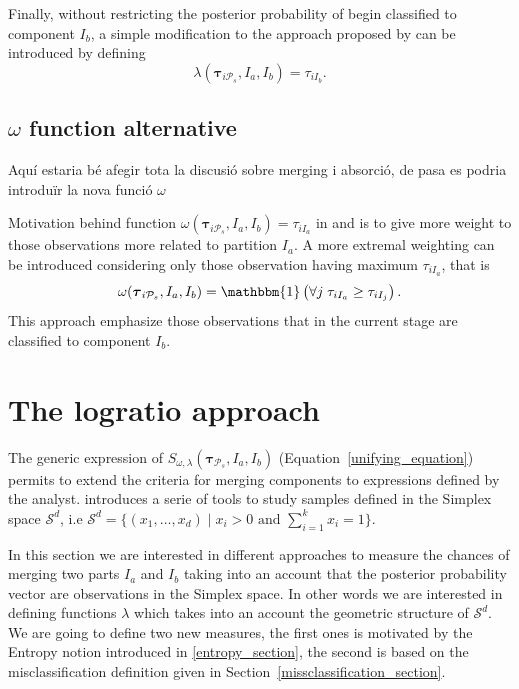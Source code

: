 \documentclass[10pt, a4paper]{article}
\newcommand{\m}[1]{\boldsymbol{#1}}
\begin{document}
\begin{spacing}{1.9}
Finally, without restricting  the posterior probability of begin classified to component $I_b$, a simple modification to the approach proposed by \cite{longford2014} can be introduced by defining
\[
\lambda(\m\tau_{i \mathcal{P}_s},  I_a,  I_b) = \tau_{iI_b}.
\]

\subsection{$\omega$ function alternative}
{ \color{red} Aquí estaria bé afegir tota la discusió sobre merging i absorció, de pasa es podria introduïr la nova funció $\omega$}

Motivation behind function $\omega(\m\tau_{i \mathcal{P}_s},  I_a,  I_b) = \tau_{iI_a}$ in \cite{hennig2010methods} and \cite{longford2014}  is to give more weight to those observations more related to partition $I_a$. A more extremal weighting can be introduced considering only those observation having maximum $ \tau_{iI_a}$, that is
\[
\omega(\m\tau_{i \mathcal{P}_s},  I_a,  I_b) = \mathbbm{1}\left( \forall j\; \tau_{i I_{a}} \geq \tau_{iI_j} \right).
\]
This approach emphasize those observations that in the current stage are classified to component $I_b$.


\section{The logratio approach}\label{logratio_section}

The generic expression of $S_{\omega, \lambda}( \m\tau_{\mathcal{P}_s},  I_a,  I_b)$ (Equation~\ref{unifying_equation}) permits to extend the criteria for merging components to expressions defined by the analyst. \cite{aitchison1986statistical} introduces a serie of tools to study samples defined in the Simplex space $\mathcal{S}^d$, i.e $\mathcal{S}^d = \{ (x_1,\dots, x_d) \;|\; x_i > 0 \text{ and } \sum_{i=1}^k x_i = 1 \}$. 

In this section we are interested in different approaches to measure the chances of merging two parts $I_a$ and $I_b$ taking into an account that the posterior probability vector are observations in the Simplex space. In other words we are interested in defining functions $\lambda$ which takes into an account the geometric structure of $\mathcal{S}^d$. We are going to define two new measures, the first ones is motivated by the Entropy notion introduced in \ref{entropy_section}, the second is based on the misclassification definition given in Section~\ref{missclassification_section}.



\end{spacing}
\end{document}
